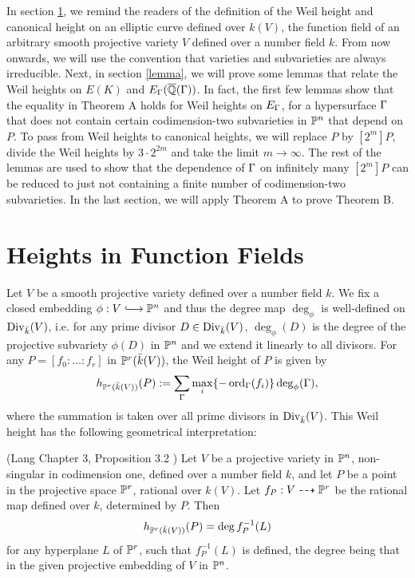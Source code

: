 \documentclass[12pt,reqno]{amsart}
\begin{document}
In section \ref{HF}, we remind the readers of the definition of the Weil height and canonical height on an elliptic curve defined over $k(V)$, the function field of an arbitrary smooth projective variety $V$ defined over a number field $k$. From now onwards, we will use the convention that varieties and subvarieties are always irreducible. Next, in section \ref{lemma}, we will prove some lemmas that relate the Weil heights on $E(K)$ and $E_\Gamma(\overline{\mathbb{Q}}(\Gamma))$. In fact, the first few lemmas show that the equality in Theorem A holds for Weil heights on $E_\Gamma$, for a hypersurface $\Gamma$ that does not contain certain codimension-two subvarieties in $\mathbb{P}^n$ that depend on $P$. To pass from Weil heights to canonical heights, we will replace $P$ by $[2^m]P$, divide the Weil heights by $3 \cdot 2^{2m}$ and take the limit $m \rightarrow \infty$. The rest of the lemmas are used to show that the dependence of $\Gamma$ on infinitely many $[2^m]P$ can be reduced to just not containing a finite number of codimension-two subvarieties. In the last section, we will apply Theorem A to prove Theorem B.

\section{Heights in Function Fields} \label{HF}
Let $V$ be a smooth projective variety defined over a number field $k$. We fix a closed embedding $\phi : V \longhookrightarrow \PP^n$ and thus the degree map $\deg_\phi$ is well-defined on $\operatorname{Div}_{\bar{k}}(V)$, i.e. for any prime divisor $D \in \operatorname{Div}_{\bar{k}}(V)$, $\deg_\phi (D)$ is the degree of the projective subvariety $\phi(D)$ in $\mathbb{P}^n$ and we extend it linearly to all divisors.  For any $P=[f_0: \ldots: f_r]$ in $\mathbb{P}^r(\bar{k}(V))$, the Weil height of $P$ is given by
$$h_{\mathbb{P}^r(\bar{k}(V))}(P):= \sum_{\Gamma} \max_i\{-\operatorname{ord}_{\Gamma}(f_i)\}\deg_\phi(\Gamma), $$ where the summation is taken over all prime divisors in $\operatorname{Div}_{\bar{k}}(V)$. This Weil height has the following geometrical interpretation:

\begin{proposition}(Lang \cite{LFD} Chapter 3, Proposition 3.2 ) \label{LH} Let $V$ be a projective variety in $\mathbb{P}^n$, non-singular in codimension one, defined over a number field $k$, and let $P$ be a point in the projective space $\mathbb{P}^r$, rational over $k(V)$. Let $f_P:V \dashrightarrow \mathbb{P}^r$ be the rational map defined over $k$, determined by $P$. Then
$$h_{\mathbb{P}^r(\bar{k}(V))}(P)=\deg f_P^{-1}(L) $$for any hyperplane $L$ of $\mathbb{P}^r$, such that $ f_P^{-1}(L)$ is defined, the degree being that in the given projective embedding of $V$ in $\mathbb{P}^n$.
\end{proposition}
\end{document}

